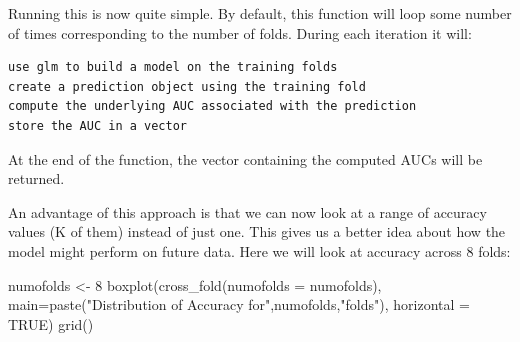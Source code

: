\documentclass[
]{article}
\newenvironment{Shaded}{\begin{snugshade}}{\end{snugshade}}
\newcommand{\AttributeTok}[1]{\textcolor[rgb]{0.77,0.63,0.00}{#1}}
\newcommand{\CommentTok}[1]{\textcolor[rgb]{0.56,0.35,0.01}{\textit{#1}}}
\newcommand{\ConstantTok}[1]{\textcolor[rgb]{0.00,0.00,0.00}{#1}}
\newcommand{\DecValTok}[1]{\textcolor[rgb]{0.00,0.00,0.81}{#1}}
\newcommand{\FunctionTok}[1]{\textcolor[rgb]{0.00,0.00,0.00}{#1}}
\newcommand{\NormalTok}[1]{#1}
\newcommand{\OtherTok}[1]{\textcolor[rgb]{0.56,0.35,0.01}{#1}}
\newcommand{\SpecialCharTok}[1]{\textcolor[rgb]{0.00,0.00,0.00}{#1}}
\newcommand{\StringTok}[1]{\textcolor[rgb]{0.31,0.60,0.02}{#1}}
\begin{document}
\begin{Shaded}
\end{Shaded}

Running this is now quite simple. By default, this function will loop
some number of times corresponding to the number of folds. During each
iteration it will:

\begin{verbatim}
use glm to build a model on the training folds
create a prediction object using the training fold
compute the underlying AUC associated with the prediction
store the AUC in a vector
\end{verbatim}

At the end of the function, the vector containing the computed AUCs will
be returned.

An advantage of this approach is that we can now look at a range of
accuracy values (K of them) instead of just one. This gives us a better
idea about how the model might perform on future data. Here we will look
at accuracy across 8 folds:

\begin{Shaded}
\begin{Highlighting}[]
\NormalTok{numofolds }\OtherTok{\textless{}{-}} \DecValTok{8}
\FunctionTok{boxplot}\NormalTok{(}\FunctionTok{cross\_fold}\NormalTok{(}\AttributeTok{numofolds =}\NormalTok{ numofolds),}
        \AttributeTok{main=}\FunctionTok{paste}\NormalTok{(}\StringTok{"Distribution of Accuracy for"}\NormalTok{,numofolds,}\StringTok{"folds"}\NormalTok{),}
        \AttributeTok{horizontal =} \ConstantTok{TRUE}\NormalTok{)}
\FunctionTok{grid}\NormalTok{()}
\end{Highlighting}
\end{Shaded}
\end{document}
